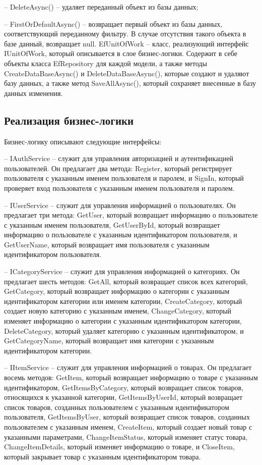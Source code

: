 – DeleteAsync() – удаляет переданный объект из базы данных;
    
– FirstOrDefaultAsync() – возвращает первый объект из базы данных, соответствующий переданному фильтру. 
В случае отсутствия такого объекта в базе данный, возвращает null.
EfUnitOfWork – класс, реализующий интерфейс IUnitOfWork, который описывается в слое бизнес-логики. 
Содержит в себе объекты класса EfRepository для каждой модели, 
а также методы CreateDataBaseAsync() и DeleteDataBaseAsync(), 
которые создают и удаляют базу данных, а также метод SaveAllAsync(), 
который сохраняет внесенные в базу данных изменения. 

\subsection{Реализация бизнес-логики}

Бизнес-логику описывают следующие интерфейсы:

– IAuthService – служит для управления авторизацией и аутентификацией пользователей. 
Он предлагает два метода: Register, который регистрирует пользователя с указанным именем пользователя и паролем, 
и SignIn, который проверяет вход пользователя с указанным именем пользователя и паролем.

– IUserService – служит для управления информацией о пользователях. 
Он предлагает три метода: GetUser, который возвращает информацию о пользователе с указанным именем пользователя, 
GetUserById, который возвращает информацию о пользователе с указанным идентификатором пользователя,
и GetUserName, который возвращает имя пользователя с указанным идентификатором пользователя.

– ICategoryService – служит для управления информацией о категориях. 
Он предлагает шесть методов: GetAll, 
который возвращает список всех категорий, GetCategory, 
который возвращает информацию о категории с указанным идентификатором категории или именем категории, 
CreateCategory, который создает новую категорию с указанным именем, ChangeCategory, 
который изменяет информацию о категории с указанным идентификатором категории, 
DeleteCategory, который удаляет категорию с указанным идентификатором, и GetCategoryName, 
который возвращает имя категории с указанным идентификатором категории.

– IItemService – служит для управления информацией о товарах. 
Он предлагает восемь методов: GetItem, 
который возвращает информацию о товаре с указанным идентификатором, GetItemsByCategory, 
который возвращает список товаров, относящихся к указанной категории, GetItemsByUserId, 
который возвращает список товаров, созданных пользователем с указанным идентификатором пользователя, 
GetItemsByUser, который возвращает список товаров, созданных пользователем с указанным именем, 
CreateItem, который создает новый товар с указанными параметрами, ChangeItemStatus, 
который изменяет статус товара, ChangeItemDetails, 
который изменяет информацию о товаре, 
и CloseItem, который закрывает товар с указанным идентификатором товара.

